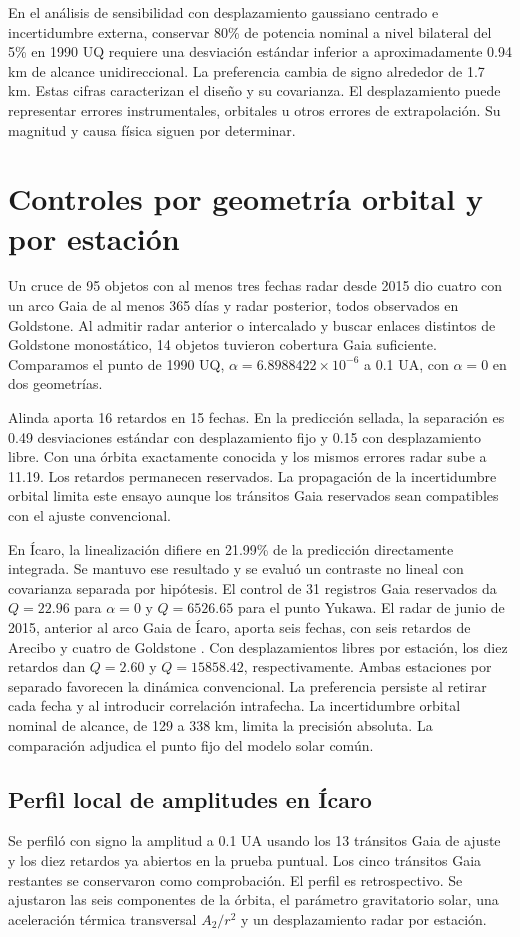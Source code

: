 \documentclass[11pt,a4paper]{article}
\begin{document}
En el análisis de sensibilidad con desplazamiento gaussiano centrado e incertidumbre externa, conservar 80\% de potencia nominal a nivel bilateral del 5\% en 1990 UQ requiere una desviación estándar inferior a aproximadamente 0.94 km de alcance unidireccional. La preferencia cambia de signo alrededor de 1.7 km. Estas cifras caracterizan el diseño y su covarianza. El desplazamiento puede representar errores instrumentales, orbitales u otros errores de extrapolación. Su magnitud y causa física siguen por determinar.

\section{Controles por geometría orbital y por estación}
Un cruce de 95 objetos con al menos tres fechas radar desde 2015 dio cuatro con un arco Gaia de al menos 365 días y radar posterior, todos observados en Goldstone. Al admitir radar anterior o intercalado y buscar enlaces distintos de Goldstone monostático, 14 objetos tuvieron cobertura Gaia suficiente. Comparamos el punto de 1990 UQ, $\alpha=6.8988422\times10^{-6}$ a 0.1 UA, con $\alpha=0$ en dos geometrías.

Alinda aporta 16 retardos en 15 fechas. En la predicción sellada, la separación es 0.49 desviaciones estándar con desplazamiento fijo y 0.15 con desplazamiento libre. Con una órbita exactamente conocida y los mismos errores radar sube a 11.19. Los retardos permanecen reservados. La propagación de la incertidumbre orbital limita este ensayo aunque los tránsitos Gaia reservados sean compatibles con el ajuste convencional.

En Ícaro, la linealización difiere en 21.99\% de la predicción directamente integrada. Se mantuvo ese resultado y se evaluó un contraste no lineal con covarianza separada por hipótesis. El control de 31 registros Gaia reservados da $Q=22.96$ para $\alpha=0$ y $Q=6526.65$ para el punto Yukawa. El radar de junio de 2015, anterior al arco Gaia de Ícaro, aporta seis fechas, con seis retardos de Arecibo y cuatro de Goldstone \cite{icarusradar}. Con desplazamientos libres por estación, los diez retardos dan $Q=2.60$ y $Q=15858.42$, respectivamente. Ambas estaciones por separado favorecen la dinámica convencional. La preferencia persiste al retirar cada fecha y al introducir correlación intrafecha. La incertidumbre orbital nominal de alcance, de 129 a 338 km, limita la precisión absoluta. La comparación adjudica el punto fijo del modelo solar común.

\subsection{Perfil local de amplitudes en Ícaro}
Se perfiló con signo la amplitud a 0.1 UA usando los 13 tránsitos Gaia de ajuste y los diez retardos ya abiertos en la prueba puntual. Los cinco tránsitos Gaia restantes se conservaron como comprobación. El perfil es retrospectivo. Se ajustaron las seis componentes de la órbita, el parámetro gravitatorio solar, una aceleración térmica transversal $A_2/r^2$ y un desplazamiento radar por estación.
\end{document}
